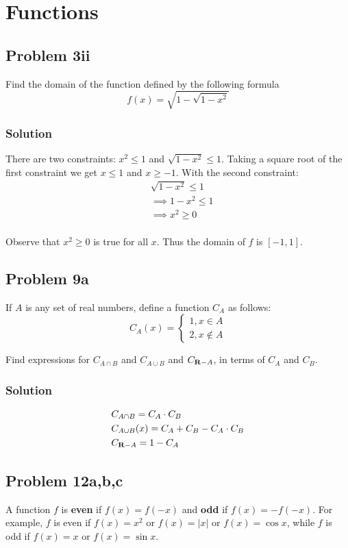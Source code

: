 \section{Functions}
\subsection*{Problem 3ii}
Find the domain of the function defined by the following formula
\[f(x)=\sqrt{1-\sqrt{1-x^2}}\]

\subsubsection*{Solution}
There are two constraints: $x^2\leq1$ and $\sqrt{1-x^2}\leq1$. Taking a square root of the first constraint we get $x\leq1$ and $x\geq-1$. With the second constraint:
\begin{align*}
    &\sqrt{1-x^2}\leq1\\
    &\implies 1-x^2\leq1\\
    &\implies x^2\geq0\\
\end{align*}

Observe that $x^2\geq 0$ is true for all $x$. Thus the domain of $f$ is $[-1,1]$.

\subsection*{Problem 9a}
If $A$ is any set of real numbers, define a function $C_A$ as follows:
\[C_A(x)=\begin{cases}
    1, x\in A\\
    2, x\not\in A
\end{cases}\]

Find expressions for $C_{A\cap B}$ and $C_{A\cup B}$ and $C_{\mathbf{R}-A}$, in terms of $C_A$ and $C_B$. 

\subsubsection*{Solution}
\begin{align*}
    &C_{A\cap B}=C_A\cdot C_B\\
    &C_{A\cup B}(x)=C_A+C_B-C_A\cdot C_B\\
    &C_{\mathbf{R}-A}=1-C_A
\end{align*}

\subsection*{Problem 12a,b,c}
A function $f$ is \textbf{even} if $f(x)=f(-x)$ and \textbf{odd} if $f(x)=-f(-x)$. For example, $f$ is even if $f(x)=x^2$ or $f(x)=|x|$ or $f(x)=\cos x$, while $f$ is odd if $f(x)=x$ or $f(x)=\sin x$.

